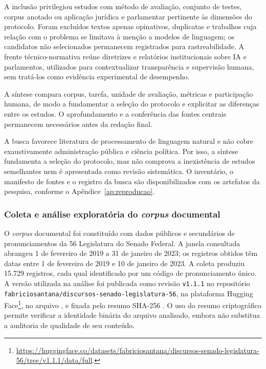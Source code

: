 A inclusão privilegiou estudos com método de avaliação, conjunto de testes, corpus anotado ou aplicação jurídica e parlamentar pertinente às dimensões do protocolo. Foram excluídos textos apenas opinativos, duplicatas e trabalhos cuja relação com o problema se limitava à menção a modelos de linguagem; os candidatos não selecionados permanecem registrados para rastreabilidade. A frente técnico-normativa reúne diretrizes e relatórios institucionais sobre IA e parlamentos, utilizados para contextualizar transparência e supervisão humana, sem tratá-los como evidência experimental de desempenho.

A síntese compara corpus, tarefa, unidade de avaliação, métricas e participação humana, de modo a fundamentar a seleção do protocolo e explicitar as diferenças entre os estudos. O aprofundamento e a conferência das fontes centrais permanecem necessários antes da redação final.

A busca favorece literatura de processamento de linguagem natural e não cobre exaustivamente administração pública e ciência política. Por isso, a síntese fundamenta a seleção do protocolo, mas não comprova a inexistência de estudos semelhantes nem é apresentada como revisão sistemática. O inventário, o manifesto de fontes e o registro da busca são disponibilizados com os artefatos da pesquisa, conforme o Apêndice~\ref{ap:reproducao}.

\subsubsection{Coleta e análise exploratória do \textit{corpus} documental}

O \textit{corpus} documental foi constituído com dados públicos e secundários de pronunciamentos da 56\textordfeminine{} Legislatura
do Senado Federal. A janela consultada abrangeu 1 de fevereiro de 2019 a 31 de janeiro de 2023; os registros obtidos têm datas entre 1 de fevereiro de 2019 e 10 de janeiro de 2023. A coleta produziu
15.729 registros, cada qual identificado por um código de pronunciamento único. A versão utilizada na análise foi publicada como
revisão \texttt{v1.1.1} no repositório \texttt{fabriciosantana/discursos-senado-legislatura-56}, na plataforma Hugging Face\footnote{\url{https://huggingface.co/datasets/fabriciosantana/discursos-senado-legislatura-56/tree/v1.1.1/data/full}.}, no arquivo , e fixada pelo resumo SHA-256 .
O uso do resumo criptográfico permite verificar a identidade binária do arquivo analisado, embora não substitua a auditoria de
qualidade de seu conteúdo.

